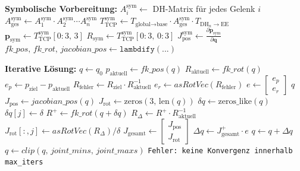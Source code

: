 \vspace{1em}
\begin{algorithm}[H]
    \caption{Iterative Inverse Kinematik mit symbolischem Vorwärtspfad und Gelenkwinkelgrenzen}
    \label{alg:inverse_kinematik}
    \begin{algorithmic}[1]
        \State \textbf{Symbolische Vorbereitung:}
        \State $A_i^{\text{sym}} \gets$ DH-Matrix für jedes Gelenk $i$
        \State $A_{\text{ges}}^{\text{sym}} \gets A_1^{\text{sym}} \cdot A_2^{\text{sym}} \cdots A_n^{\text{sym}}$
        \State $T_{\text{TCP}}^{\text{sym}} \gets T_{\text{global} \rightarrow \text{base}} \cdot A_{\text{ges}}^{\text{sym}} \cdot T_{\text{DH}_n \rightarrow \text{EE}}$
        \State $\mathbf{p}_{\text{sym}} \gets T_{\text{TCP}}^{\text{sym}}[0{:}3,\, 3]$
        \State $R_{\text{sym}} \gets T_{\text{TCP}}^{\text{sym}}[0{:}3,\, 0{:}3]$
        \State $J_{\text{pos}}^{\text{sym}} \gets \frac{\partial \mathbf{p}_{\text{sym}}}{\partial \mathbf{q}}$
        \State $\mathit{fk\_pos},\, \mathit{fk\_rot},\, \mathit{jacobian\_pos} \gets \texttt{lambdify}(...)$

        \Statex
        \State \textbf{Iterative Lösung:}
        \State $q \gets q_0$ 
            \State $p_{\text{aktuell}} \gets \mathit{fk\_pos}(q)$
            \State $R_{\text{aktuell}} \gets \mathit{fk\_rot}(q)$
            \State $e_p \gets p_{\text{ziel}} - p_{\text{aktuell}}$
            \State $R_{\text{fehler}} \gets R_{\text{ziel}} \cdot R_{\text{aktuell}}^{-1}$
            \State $e_r \gets \mathit{asRotVec}(R_{\text{fehler}})$
            \State $e \gets \begin{bmatrix} e_p \\ e_r \end{bmatrix}$ 
                \State \Return $q$
            \EndIf
            \State $J_{\text{pos}} \gets \mathit{jacobian\_pos}(q)$
            \State $J_{\text{rot}} \gets \text{zeros}(3,\, \text{len}(q))$
                \State $\delta q \gets \text{zeros\_like}(q)$
                \State $\delta q[j] \gets \delta$
                \State $R^+ \gets \mathit{fk\_rot}(q + \delta q)$
                \State $R_{\Delta} \gets R^+ \cdot R_{\text{aktuell}}^{-1}$
                \State $J_{\text{rot}}[:, j] \gets \mathit{asRotVec}(R_{\Delta}) / \delta$
            \EndFor
            \State $J_{\text{gesamt}} \gets \begin{bmatrix} J_{\text{pos}} \\ J_{\text{rot}} \end{bmatrix}$
            \State $\Delta q \gets J_{\text{gesamt}}^{+} \cdot e$
            \State $q \gets q + \Delta q$
                \State $q \gets \mathit{clip}(q,\, \mathit{joint\_mins},\, \mathit{joint\_maxs})$
            \EndIf
        \EndFor
        \State \Return \texttt{Fehler: keine Konvergenz innerhalb max\_iters}
    \end{algorithmic}
\end{algorithm}
